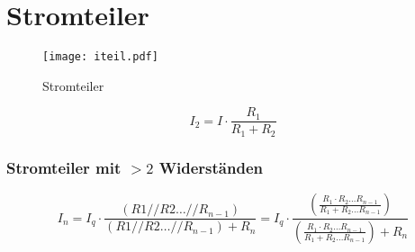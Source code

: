 



\newpage
\section{Stromteiler}
\begin{figure}[h!]
	\centering
	\texttt{[image: iteil.pdf]}
	\caption{Stromteiler}
	\label{sch:iteil}
\end{figure}
\[ I_2 = I \cdot \frac{R_1}{R_1 + R_2} \]

\subsubsection{Stromteiler mit $> 2$ Widerständen}
\[ I_n = I_q \cdot \frac{(R1 // R2 \dots // R_{n-1})}
{(R1 // R2 \dots // R_{n-1}) + R_n} 
= I_q \cdot \frac{\left(\frac{R_1 \cdot R_2 \dots R_{n-1}}
{R_1 + R_2 \dots R_{n-1}}\right)}
{\left(\frac{R_1 \cdot R_2 \dots R_{n-1}}
{R_1 + R_2 \dots R_{n-1}}\right) + R_n} \]